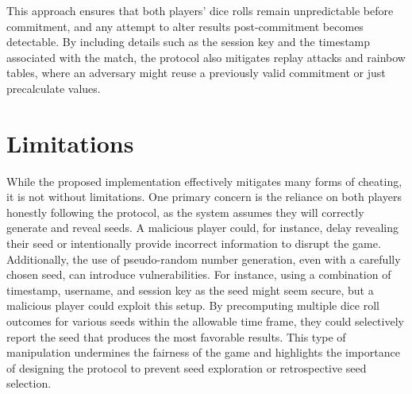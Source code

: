 \documentclass{article}
\begin{document}
This approach ensures that both players' dice rolls remain unpredictable before commitment, and any attempt to alter results post-commitment becomes detectable. By including details such as the session key and the timestamp associated with the match, the protocol also mitigates replay attacks and rainbow tables, where an adversary might reuse a previously valid commitment or just precalculate values.

\section{Limitations}

While the proposed implementation effectively mitigates many forms of cheating, it is not without limitations. One primary concern is the reliance on both players honestly following the protocol, as the system assumes they will correctly generate and reveal seeds. A malicious player could, for instance, delay revealing their seed or intentionally provide incorrect information to disrupt the game. Additionally, the use of pseudo-random number generation, even with a carefully chosen seed, can introduce vulnerabilities. For instance, using a combination of timestamp, username, and session key as the seed might seem secure, but a malicious player could exploit this setup. By precomputing multiple dice roll outcomes for various seeds within the allowable time frame, they could selectively report the seed that produces the most favorable results. This type of manipulation undermines the fairness of the game and highlights the importance of designing the protocol to prevent seed exploration or retrospective seed selection.
\end{document}
